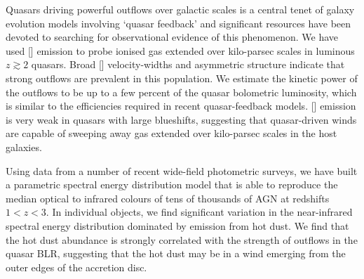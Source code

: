 \documentclass[a4paper,11pt]{article}
\newcommand\ion[2]{\text{#1\,\textsc{\lowercase{#2}}}}
\begin{document}
Quasars driving powerful outflows over galactic scales is a central tenet of galaxy evolution models involving `quasar feedback' and significant resources have been devoted to searching for observational evidence of this phenomenon.  
We have used [\ion{O}{III}] emission to probe ionised gas extended over kilo-parsec scales in luminous $z\gtrsim2$ quasars.
Broad [\ion{O}{III}] velocity-widths and asymmetric structure indicate that strong outflows are prevalent in this population.  
We estimate the kinetic power of the outflows to be up to a few percent of the quasar bolometric luminosity, which is similar to the efficiencies required in recent quasar-feedback models. 
[\ion{O}{III}] emission is very weak in quasars with large \ion{C}{IV} blueshifts, suggesting that quasar-driven winds are capable of sweeping away gas extended over kilo-parsec scales in the host galaxies. 

Using data from a number of recent wide-field photometric surveys, we have built a parametric spectral energy distribution model that is able to reproduce the median optical to infrared colours of tens of thousands of AGN at redshifts $1 < z < 3$. 
In individual objects, we find significant variation in the near-infrared spectral energy distribution dominated by emission from hot dust. 
We find that the hot dust abundance is strongly correlated with the strength of outflows in the quasar BLR, suggesting that the hot dust may be in a wind emerging from the outer edges of the accretion disc. 
\end{document}
